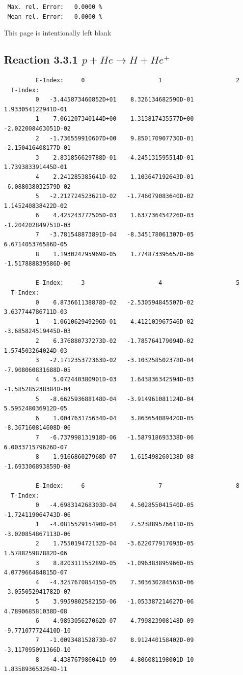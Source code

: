 \documentclass[12pt,dvips]{article}
\begin{document}
\begin{small}
\begin{verbatim}
 Max. rel. Error:   0.0000 %
 Mean rel. Error:   0.0000 %
\end{verbatim}\end{small}

\newpage
This page is intentionally left blank
\newpage
\subsection{
Reaction 3.3.1  $  p + He \rightarrow  H + He^+ $
}



\begin{small}\begin{verbatim}
         E-Index:     0                     1                     2
  T-Index:
         0   -3.445873460852D+01    8.326134682590D-01    1.933054122941D-01
         1    7.061207340144D+00   -1.313817435577D+00   -2.022008463051D-02
         2   -1.736559910607D+00    9.850170907730D-01   -2.150416408177D-01
         3    2.831856629788D-01   -4.245131595514D-01    1.739383391445D-01
         4    2.241285385641D-02    1.103647192643D-01   -6.088038032579D-02
         5   -2.212724523621D-02   -1.746079083640D-02    1.145240838422D-02
         6    4.425243772505D-03    1.637736454226D-03   -1.204202849751D-03
         7   -3.781548873891D-04   -8.345178061307D-05    6.671405376586D-05
         8    1.193024795969D-05    1.774873395657D-06   -1.517888839586D-06

         E-Index:     3                     4                     5
  T-Index:
         0    6.873661138878D-02   -2.530594845507D-02    3.637744786711D-03
         1   -1.061062949296D-01    4.412103967546D-02   -3.685824519445D-03
         2    6.376880737273D-02   -1.785764179094D-02    1.574503264024D-03
         3   -2.171235372363D-02   -3.103258502378D-04   -7.908060831688D-05
         4    5.072440380901D-03    1.643836342594D-03   -1.585285238384D-04
         5   -8.662593688148D-04   -3.914961081124D-04    5.595248036912D-05
         6    1.004763175634D-04    3.863654089420D-05   -8.367160814608D-06
         7   -6.737998131918D-06   -1.587918693338D-06    6.003371579626D-07
         8    1.916686027968D-07    1.615498260138D-08   -1.693306893859D-08

         E-Index:     6                     7                     8
  T-Index:
         0   -4.698314268303D-04    4.502855041540D-05   -1.724119064743D-06
         1   -4.081552915490D-04    7.523889576611D-05   -3.020854867113D-06
         2    1.755019472132D-04   -3.622077917093D-05    1.578825987882D-06
         3    8.820311155289D-05   -1.096383895966D-05    4.077966484815D-07
         4   -4.325767085415D-05    7.303630284565D-06   -3.055052941782D-07
         5    3.995980258215D-06   -1.053387214627D-06    4.789068581038D-08
         6    4.989305627062D-07    4.799823908148D-09   -9.771077724410D-10
         7   -1.009348152873D-07    8.912440158402D-09   -3.117095091366D-10
         8    4.438767986041D-09   -4.806081198001D-10    1.835893653264D-11


\end{verbatim}
\end{small}
\end{document}
